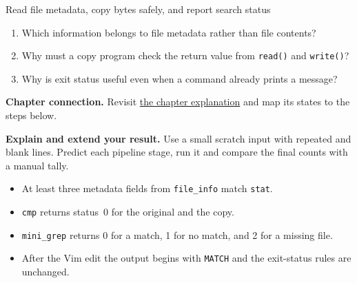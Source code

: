 \begin{labproject}{Read file metadata, copy bytes safely, and report search status}
\begin{quickcheck}
\begin{enumerate}
  \item Which information belongs to file metadata rather than file contents?
  \item Why must a copy program check the return value from \texttt{read()} and \texttt{write()}?
  \item Why is exit status useful even when a command already prints a message?
\end{enumerate}
\end{quickcheck}

\textbf{Chapter connection.} Revisit \hyperref[ch:files-cli]{the chapter explanation} and map its states to the steps below.


\begin{verification}
\textbf{Explain and extend your result.} Use a small scratch input with repeated and blank lines. Predict each pipeline stage, run it and compare the final counts with a manual tally.


\begin{itemize}
  \item At least three metadata fields from \texttt{file\_info} match \texttt{stat}.
  \item \texttt{cmp} returns status~0 for the original and the copy.
  \item \texttt{mini\_grep} returns 0 for a match, 1 for no match, and 2 for a missing file.
  \item After the Vim edit the output begins with \texttt{MATCH} and the exit-status rules are unchanged.
\end{itemize}
\end{verification}
\end{labproject}
